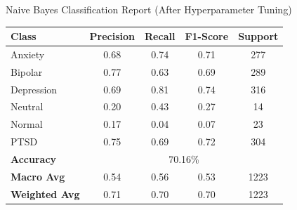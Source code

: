 \begin{center}
\vspace{0.25in}

\caption{Naive Bayes Classification Report (After Hyperparameter Tuning)}
\begin{tabular}{|l|c|c|c|c|}
\hline
\textbf{Class} & \textbf{Precision} & \textbf{Recall} & \textbf{F1-Score} & \textbf{Support} \\ \hline
Anxiety        & 0.68               & 0.74            & 0.71              & 277              \\ \hline
Bipolar        & 0.77               & 0.63            & 0.69              & 289              \\ \hline
Depression     & 0.69               & 0.81            & 0.74              & 316              \\ \hline
Neutral        & 0.20               & 0.43            & 0.27              & 14               \\ \hline
Normal         & 0.17               & 0.04            & 0.07              & 23               \\ \hline
PTSD           & 0.75               & 0.69            & 0.72              & 304              \\ \hline
\textbf{Accuracy} & \multicolumn{4}{|c|}{70.16\%} \\ \hline
\textbf{Macro Avg} & 0.54            & 0.56            & 0.53              & 1223             \\ \hline
\textbf{Weighted Avg} & 0.71         & 0.70            & 0.70              & 1223             \\ \hline
\end{tabular}

\vspace{0.25in}


\end{center}
